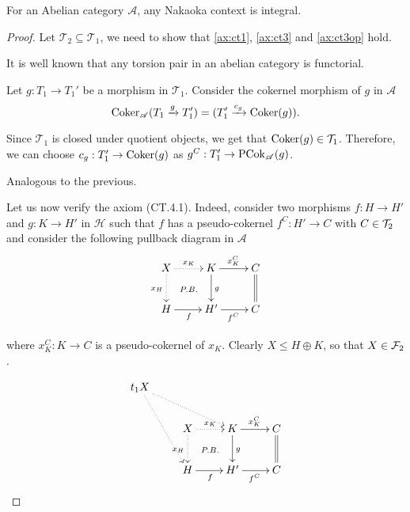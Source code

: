 \begin{lemma}\label{rmk:2.2}
For an Abelian category $\mathscr{A}$, any Nakaoka context is integral.
\end{lemma}
\begin{proof}
  Let $\mathcal{T}_2\subseteq\mathcal{T}_1$, we need to show that \ref{ax:ct1},
  \ref{ax:ct3} and \ref{ax:ct3op} hold.
  \begin{torsionaxioms}
    \item It is well known that any torsion pair in an abelian category is functorial.
    \setcounter{enumi}{2}
    \item Let $g:T_1\to T_1'$ be a morphism in $\mathcal{T}_1$. Consider the cokernel morphism
    of $g$ in $\mathscr{A}$
    \begin{equation*}
      \operatorname{Coker}_\mathscr{A}(T_1\xrightarrow{g}T_1')=(T_1'\xrightarrow{c_g}\operatorname{Coker}(g)).
    \end{equation*}
    \begin{sloppypar}
    Since $\mathcal{T}_1$ is closed under quotient objects, we get that ${\operatorname{Coker}(g)\in\mathcal{T}_1}$.
    Therefore, we can choose ${c_g:T_1'\to\operatorname{Coker}(g)}$ as ${g^C:T_1'\to\operatorname{PCok}_\mathscr{A}(g)}$.
  \end{sloppypar}
    \varitem{^\ast} Analogous to the previous.
  \end{torsionaxioms}

\bigskip\bigskip
Let us now verify the axiom (CT.4.1). Indeed, consider two morphisms $f\colon H\to H'$ and $g\colon K\to H'$ in $\mathcal{H}$ such that $f$ has a pseudo-cokernel $f^C\colon H'\to C$ with $C\in \mathcal{T}_2$ and consider the following pullback diagram in $\mathscr{A}$
\[
\xymatrix{
X\ar@{}[dr]|{P.B.}\ar@{.>}[d]_{x_H}\ar@{.>}[r]^{x_K}&K\ar[r]^{x_K^C}\ar[d]^{g}&C\ar@{=}[d]\\
H\ar[r]_f&H'\ar[r]_{f^C}&C
}
\]
\begin{sloppypar}
where $x_K^C\colon K\to C$ is a pseudo-cokernel of $x_K$. Clearly ${X\leq H\oplus K}$, so that $X\in \mathcal{F}_2$.
\end{sloppypar}
\[
\xymatrix{
t_1X\ar@{.>}[rrd]\ar@{.>}[ddr]\\
&X\ar@{}[dr]|{P.B.}\ar@{.>}[d]_{x_H}\ar@{.>}[r]^{x_K}&K\ar[r]^{x_K^C}\ar[d]^{g}&C\ar@{=}[d]\\
&H\ar[r]_f&H'\ar[r]_{f^C}&C
}
\]
\end{proof}

